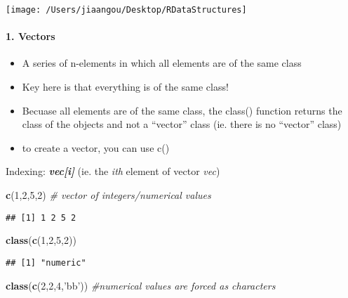 \documentclass[]{article}
\newenvironment{Shaded}{\begin{snugshade}}{\end{snugshade}}
\newcommand{\KeywordTok}[1]{\textcolor[rgb]{0.13,0.29,0.53}{\textbf{{#1}}}}
\newcommand{\DecValTok}[1]{\textcolor[rgb]{0.00,0.00,0.81}{{#1}}}
\newcommand{\StringTok}[1]{\textcolor[rgb]{0.31,0.60,0.02}{{#1}}}
\newcommand{\CommentTok}[1]{\textcolor[rgb]{0.56,0.35,0.01}{\textit{{#1}}}}
\newcommand{\NormalTok}[1]{{#1}}
\providecommand{\tightlist}{%
  \setlength{\itemsep}{0pt}\setlength{\parskip}{0pt}}
\let\oldparagraph\paragraph
\renewcommand{\paragraph}[1]{\oldparagraph{#1}\mbox{}}
\begin{document}
\begin{center}\texttt{[image: /Users/jiaangou/Desktop/RDataStructures]} \end{center}

\paragraph{1. Vectors}\label{vectors}

\begin{itemize}
\tightlist
\item
  A series of n-elements in which all elements are of the same class
\item
  Key here is that everything is of the same class!
\item
  Becuase all elements are of the same class, the class() function
  returns the class of the objects and not a ``vector'' class (ie. there
  is no ``vector'' class)
\item
  to create a vector, you can use c()
\end{itemize}

Indexing: \textbf{\emph{vec{[}i{]}}} (ie. the \emph{ith} element of
vector \emph{vec})

\begin{Shaded}
\begin{Highlighting}[]
\KeywordTok{c}\NormalTok{(}\DecValTok{1}\NormalTok{,}\DecValTok{2}\NormalTok{,}\DecValTok{5}\NormalTok{,}\DecValTok{2}\NormalTok{) }\CommentTok{# vector of integers/numerical values}
\end{Highlighting}
\end{Shaded}

\begin{verbatim}
## [1] 1 2 5 2
\end{verbatim}

\begin{Shaded}
\begin{Highlighting}[]
\KeywordTok{class}\NormalTok{(}\KeywordTok{c}\NormalTok{(}\DecValTok{1}\NormalTok{,}\DecValTok{2}\NormalTok{,}\DecValTok{5}\NormalTok{,}\DecValTok{2}\NormalTok{))}
\end{Highlighting}
\end{Shaded}

\begin{verbatim}
## [1] "numeric"
\end{verbatim}

\begin{Shaded}
\begin{Highlighting}[]
\KeywordTok{class}\NormalTok{(}\KeywordTok{c}\NormalTok{(}\DecValTok{2}\NormalTok{,}\DecValTok{2}\NormalTok{,}\DecValTok{4}\NormalTok{,}\StringTok{'bb'}\NormalTok{)) }\CommentTok{#numerical values are forced as characters}
\end{Highlighting}
\end{Shaded}
\end{document}
